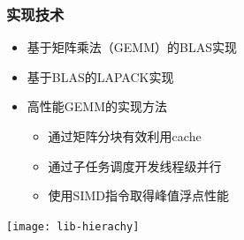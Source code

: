 \documentclass[aspectratio=169]{beamer}
\begin{document}
\begin{frame}
  \frametitle{实现技术}
  \begin{itemize}
  \item 基于矩阵乘法（GEMM）的BLAS实现
  \item 基于BLAS的LAPACK实现
  \item 高性能GEMM的实现方法
    \begin{itemize}
    \item 通过矩阵分块有效利用cache
    \item 通过子任务调度开发线程级并行
    \item 使用SIMD指令取得峰值浮点性能
    \end{itemize}
  \end{itemize}
  \texttt{[image: lib-hierachy]}
\end{frame}
\end{document}

